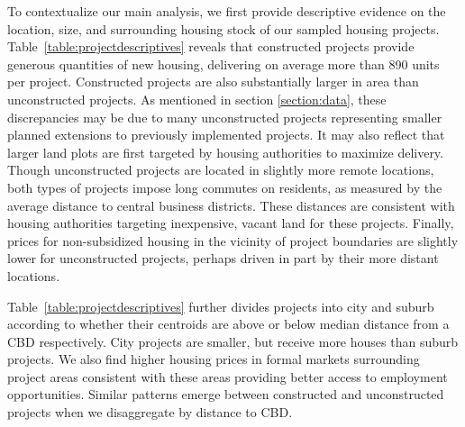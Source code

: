 \documentclass[12pt]{article}
\begin{document}
To contextualize our main analysis, we first provide descriptive evidence on the location, size, and surrounding housing stock of our  sampled housing projects. Table~\ref{table:projectdescriptives} reveals that constructed projects provide generous quantities of new housing, delivering on average more than 890 units per project. Constructed projects are also substantially larger in area than unconstructed projects. As mentioned in section \ref{section:data}, these discrepancies may be due to many unconstructed projects representing smaller planned extensions to previously implemented projects. It may also reflect that larger land plots are first targeted by housing authorities to maximize delivery. Though unconstructed projects are located in slightly more remote locations, both types of projects impose long commutes on residents, as measured by the average distance to central business districts. These distances are consistent with housing authorities targeting inexpensive, vacant land for these projects. Finally, prices for non-subsidized housing in the vicinity of project boundaries are slightly lower for unconstructed projects, perhaps driven in part by their more distant locations.

Table~\ref{table:projectdescriptives} further divides projects into city and suburb according to whether their centroids are above or below median distance from a CBD respectively.  City projects are smaller, but receive more houses than suburb projects.  We also find higher housing prices in formal markets surrounding project areas consistent with these areas providing better access to employment opportunities.  Similar patterns emerge between constructed and unconstructed projects when we disaggregate by distance to CBD.
\end{document}
